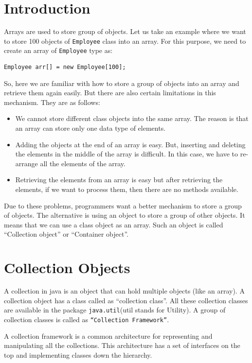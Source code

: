 \documentclass[11pt,a4paper]{article}
\author{TalentSprint}
\date{}
\begin{document}
\section*{Introduction}

Arrays are used to store group of objects. Let us take an example where we want to store 100 objects of \texttt{Employee} class into an array. For this purpose, we need to create an array of \texttt{Employee} type as:
\begin{lstlisting}[numbers=none]
    Employee arr[] = new Employee[100];
\end{lstlisting}
So, here we are familiar with how to store a group of objects into an array and retrieve them again easily. But there are also certain limitations in this mechanism. They are as follows:

\begin{itemize}
\item We cannot store different class objects into the same array. The reason is that an array can store only one data type of elements.
\item Adding the objects at the end of an array is easy. But, inserting and deleting the elements in the middle of the array is difficult. In this case, we have to re-arrange all the elements of the array.
\item Retrieving the elements from an array is easy but after retrieving the elements, if we want to process them, then there are no methods available.
\end{itemize}
Due to these problems, programmers want a better mechanism to store a group of objects. The alternative is using an object to store a group of other objects. It means that we can use a class object as an array. Such an object is called ``Collection object'' or ``Container object''.

\section*{Collection Objects}
A collection in java is an object that can hold multiple objects (like an array). A collection object has a class called as ``collection class''. All these collection classes are available in the package \texttt{java.util}(util stands for Utility). A group of collection classes is called as \texttt{``Collection Framework''}.

A collection framework is a common architecture for representing and manipulating all the collections. This architecture has a set of interfaces on the top and implementing classes down the hierarchy.
\end{document}
